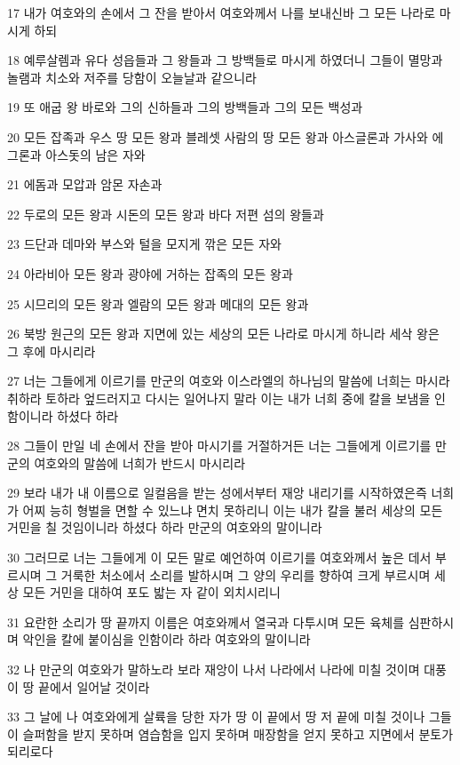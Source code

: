 \par 17 내가 여호와의 손에서 그 잔을 받아서 여호와께서 나를 보내신바 그 모든 나라로 마시게 하되
\par 18 예루살렘과 유다 성읍들과 그 왕들과 그 방백들로 마시게 하였더니 그들이 멸망과 놀램과 치소와 저주를 당함이 오늘날과 같으니라
\par 19 또 애굽 왕 바로와 그의 신하들과 그의 방백들과 그의 모든 백성과
\par 20 모든 잡족과 우스 땅 모든 왕과 블레셋 사람의 땅 모든 왕과 아스글론과 가사와 에그론과 아스돗의 남은 자와
\par 21 에돔과 모압과 암몬 자손과
\par 22 두로의 모든 왕과 시돈의 모든 왕과 바다 저편 섬의 왕들과
\par 23 드단과 데마와 부스와 털을 모지게 깎은 모든 자와
\par 24 아라비아 모든 왕과 광야에 거하는 잡족의 모든 왕과
\par 25 시므리의 모든 왕과 엘람의 모든 왕과 메대의 모든 왕과
\par 26 북방 원근의 모든 왕과 지면에 있는 세상의 모든 나라로 마시게 하니라 세삭 왕은 그 후에 마시리라
\par 27 너는 그들에게 이르기를 만군의 여호와 이스라엘의 하나님의 말씀에 너희는 마시라 취하라 토하라 엎드러지고 다시는 일어나지 말라 이는 내가 너희 중에 칼을 보냄을 인함이니라 하셨다 하라
\par 28 그들이 만일 네 손에서 잔을 받아 마시기를 거절하거든 너는 그들에게 이르기를 만군의 여호와의 말씀에 너희가 반드시 마시리라
\par 29 보라 내가 내 이름으로 일컬음을 받는 성에서부터 재앙 내리기를 시작하였은즉 너희가 어찌 능히 형벌을 면할 수 있느냐 면치 못하리니 이는 내가 칼을 불러 세상의 모든 거민을 칠 것임이니라 하셨다 하라 만군의 여호와의 말이니라
\par 30 그러므로 너는 그들에게 이 모든 말로 예언하여 이르기를 여호와께서 높은 데서 부르시며 그 거룩한 처소에서 소리를 발하시며 그 양의 우리를 향하여 크게 부르시며 세상 모든 거민을 대하여 포도 밟는 자 같이 외치시리니
\par 31 요란한 소리가 땅 끝까지 이름은 여호와께서 열국과 다투시며 모든 육체를 심판하시며 악인을 칼에 붙이심을 인함이라 하라 여호와의 말이니라
\par 32 나 만군의 여호와가 말하노라 보라 재앙이 나서 나라에서 나라에 미칠 것이며 대풍이 땅 끝에서 일어날 것이라
\par 33 그 날에 나 여호와에게 살륙을 당한 자가 땅 이 끝에서 땅 저 끝에 미칠 것이나 그들이 슬퍼함을 받지 못하며 염습함을 입지 못하며 매장함을 얻지 못하고 지면에서 분토가 되리로다
